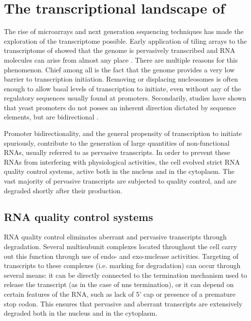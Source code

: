 \section{The transcriptional landscape of \cer{}} %

The rise of microarrays and next generation sequencing techniques has made the exploration of the transcriptome possible. 
Early application of tiling arrays to the transcriptome of \cer{} showed that the genome is pervasively transcribed and RNA molecules can arise from almost any place \cite{neil:2009:widespread,xu:2009:bidirectional}. 
There are multiple reasons for this phenomenon.
Chief among all is the fact that the genome provides a very low barrier to transcription initiation.
Removing or displacing nucleosomes is often enough to allow basal levels of transcription to initiate, even without any of the regulatory sequences usually found at promoters.
Secondarily, studies have shown that yeast promoters do not posses an inherent direction dictated by sequence elements, but are bidirectional \cite{neil:2009:widespread,xu:2009:bidirectional}.

Promoter bidirectionality, and the general propensity of transcription to initiate spuriously, contribute to the generation of large quantities of non-functional RNAs, usually referred to as pervasive transcripts.
In order to prevent these RNAs from interfering with physiological activities, the cell evolved strict RNA quality control systems, active both in the nucleus and in the cytoplasm.
The vast majority of pervasive transcripts are subjected to quality control, and are degraded shortly after their production.

\subsection{RNA quality control systems}

RNA quality control eliminates aberrant and pervasive transcripts through degradation.
Several multisubunit complexes located throughout the cell carry out this function through use of endo- and exo-nuclease activities.
Targeting of transcripts to these complexes (i.e. marking for degradation) can occur through several means: it can be directly connected to the termination mechanism used to release the transcript (as in the case of \gls{nns} termination), or it can depend on certain features of the RNA, such as lack of 5' cap or presence of a premature stop codon.
This ensures that pervasive and aberrant transcripts are extensively degraded both in the nucleus and in the cytoplasm.

